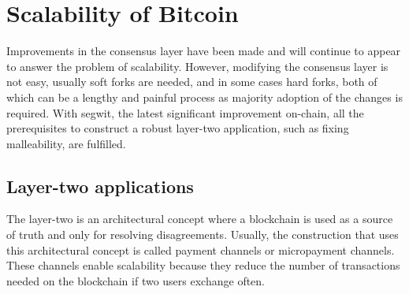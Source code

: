 \section{Scalability of Bitcoin}

Improvements in the consensus layer have been made and will continue to appear
to answer the problem of scalability. However, modifying the consensus layer is
not easy, usually soft forks are needed, and in some cases hard forks, both of which
can be a lengthy and painful process as majority adoption of the changes is required. With
\gls{segwit}, the latest significant improvement on-chain, all the prerequisites
to construct a robust layer-two application, such as fixing malleability, are
fulfilled.

\subsection{Layer-two applications}

The layer-two is an architectural concept where a blockchain is used as a source
of truth and only for resolving disagreements. Usually, the construction that
uses this architectural concept is called payment channels or micropayment
channels. These channels enable scalability because they reduce the number of
transactions needed on the blockchain if two users exchange often.
